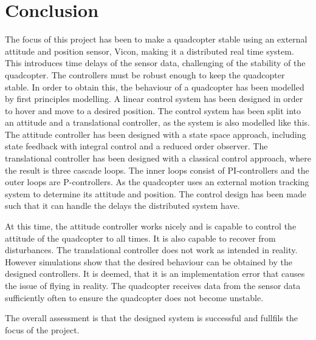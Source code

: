 \chapter{Conclusion}
The focus of this project has been to make a quadcopter stable using an external attitude and position sensor, Vicon, making it a distributed real time system. This introduces time delays of the sensor data, challenging of the stability of the quadcopter. The controllers must be robust enough to keep the quadcopter stable. In order to obtain this, the behaviour of a quadcopter has been modelled by first principles modelling. A linear control system has been designed in order to hover and move to a desired position.
The control system has been split into an attitude and a translational controller, as the system is also modelled like this. The attitude controller has been designed with a state space approach, including state feedback with integral control and a reduced order observer. The translational controller has been designed with a classical control approach, where the result is three cascade loops. The inner loops consist of  PI-controllers and the outer loops are P-controllers. 
As the quadcopter uses an external motion tracking system to determine its attitude and position. The control design has been made such that it can handle the delays the distributed system have.

At this time, the attitude controller works nicely and is capable to control the attitude of the quadcopter to all times. It is also capable to recover from disturbances. The translational controller does not work as intended in reality. However simulations show that the desired behaviour can be obtained by the designed controllers. It is deemed, that it is an implementation error that causes the issue of flying in reality. 
The quadcopter receives data from the sensor data sufficiently often to ensure the quadcopter does not become unstable.  

The overall assessment is that the designed system is successful and fullfils the focus of the project.  

